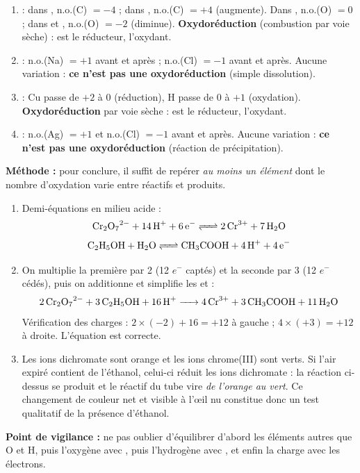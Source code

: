 \documentclass[11pt]{article}
\begin{document}
\begin{corrige}
\begin{enumerate}
\item {} : dans , n.o.(C) $= -4$ ; dans , n.o.(C) $= +4$ (augmente). Dans , n.o.(O) $= 0$ ; dans  et , n.o.(O) $= -2$ (diminue). \textbf{Oxydoréduction} (combustion par voie sèche) :  est le réducteur,  l'oxydant.
\item {} : n.o.(Na) $= +1$ avant et après ; n.o.(Cl) $= -1$ avant et après. Aucune variation : \textbf{ce n'est pas une oxydoréduction} (simple dissolution).
\item {} : Cu passe de $+2$ à $0$ (réduction), H passe de $0$ à $+1$ (oxydation). \textbf{Oxydoréduction} par voie sèche :  est le réducteur,  l'oxydant.
\item {} : n.o.(Ag) $= +1$ et n.o.(Cl) $= -1$ avant et après. Aucune variation : \textbf{ce n'est pas une oxydoréduction} (réaction de précipitation).
\end{enumerate}
\textbf{Méthode :} pour conclure, il suffit de repérer \emph{au moins un élément} dont le nombre d'oxydation varie entre réactifs et produits.
\end{corrige}

\begin{corrige}
\begin{enumerate}
\item Demi-équations en milieu acide :
\[ \ce{Cr2O7^2- + 14 H+ + 6 e- <=> 2 Cr^3+ + 7 H2O} \]
\[ \ce{C2H5OH + H2O <=> CH3COOH + 4 H+ + 4 e-} \]
\item On multiplie la première par 2 (12 $e^-$ captés) et la seconde par 3 (12 $e^-$ cédés), puis on additionne et simplifie les  et  :
\[ \ce{2 Cr2O7^2- + 3 C2H5OH + 16 H+ -> 4 Cr^3+ + 3 CH3COOH + 11 H2O} \]
Vérification des charges : $2\times(-2) + 16 = +12$ à gauche ; $4\times(+3) = +12$ à droite. L'équation est correcte.
\item Les ions dichromate  sont orange et les ions chrome(III)  sont verts. Si l'air expiré contient de l'éthanol, celui-ci réduit les ions dichromate : la réaction ci-dessus se produit et le réactif du tube vire \emph{de l'orange au vert}. Ce changement de couleur net et visible à l'œil nu constitue donc un test qualitatif de la présence d'éthanol.
\end{enumerate}
\textbf{Point de vigilance :} ne pas oublier d'équilibrer d'abord les éléments autres que O et H, puis l'oxygène avec , puis l'hydrogène avec , et enfin la charge avec les électrons.
\end{corrige}
\end{document}
